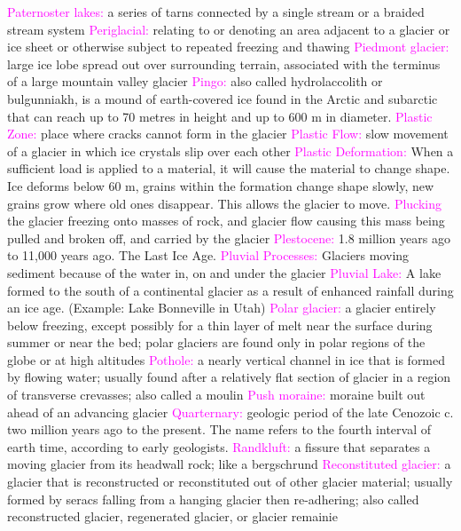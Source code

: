 \documentclass{article}
\newcommand{\pink}[1]{\textcolor{magenta}{#1}}
\newcommand{\vocab}[1]{{\pink{#1}}}
\begin{document}
\begin{multicols*}{4}
		\vocab{        Paternoster lakes: } a series of tarns connected by a single stream or a braided stream system 
		\vocab{        Periglacial: } relating to or denoting an area adjacent to a glacier or ice sheet or otherwise subject to repeated freezing and thawing          
		\vocab{        Piedmont glacier: } large ice lobe spread out over surrounding terrain, associated with the terminus of a large mountain valley glacier 
		\vocab{        Pingo: } also called hydrolaccolith or bulgunniakh, is a mound of earth-covered ice found in the Arctic and subarctic that can reach up to 70 metres in height and up to 600 m in diameter.         
		\vocab{Plastic Zone: } place where cracks cannot form in the glacier  
		\vocab{Plastic Flow: } slow movement of a glacier in which ice crystals slip over each other  
		\vocab{Plastic Deformation: } When a sufficient load is applied to a material, it will cause the material to change shape. Ice deforms below 60 m, grains within the formation change shape slowly, new grains grow where old ones disappear. This allows the glacier to move.  
		\vocab{Plucking} the glacier freezing onto masses of rock, and glacier flow causing this mass being pulled and broken off, and carried by the glacier  
		\vocab{Plestocene: } 1.8 million years ago to 11,000 years ago. The Last Ice Age.   
		\vocab{Pluvial Processes: } Glaciers moving sediment because of the water in, on and under the glacier  
		\vocab{Pluvial Lake: } A lake formed to the south of a continental glacier as a result of enhanced rainfall during an ice age. (Example: Lake Bonneville in Utah)  
		\vocab{        Polar glacier: } a glacier entirely below freezing, except possibly for a thin layer of melt near the surface during summer or near the bed; polar glaciers are found only in polar regions of the globe or at high altitudes 
		\vocab{        Pothole: } a nearly vertical channel in ice that is formed by flowing water; usually found after a relatively flat section of glacier in a region of transverse crevasses; also called a moulin 
		\vocab{        Push moraine: } moraine built out ahead of an advancing glacier 
		\vocab{Quarternary: } geologic period of the late Cenozoic c. two million years ago to the present. The name refers to the fourth interval of earth time, according to early geologists.   
		\vocab{        Randkluft: } a fissure that separates a moving glacier from its headwall rock; like a bergschrund 
		\vocab{        Reconstituted glacier: } a glacier that is reconstructed or reconstituted out of other glacier material; usually formed by seracs falling from a hanging glacier then re-adhering; also called reconstructed glacier, regenerated glacier, or glacier remainie 

\end{multicols*}
\end{document}
